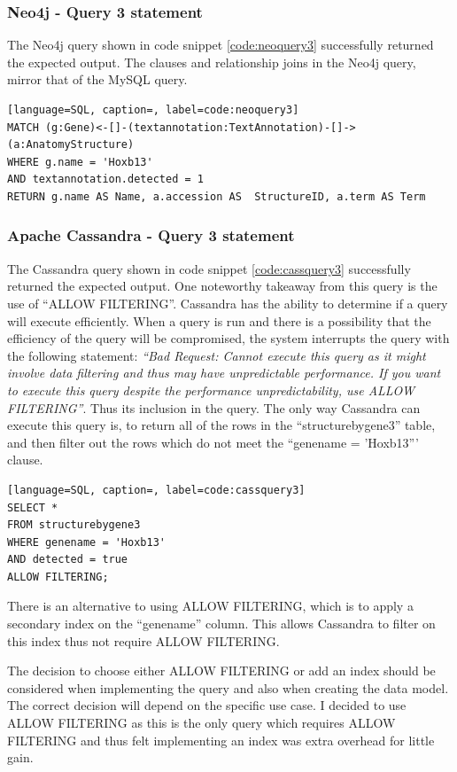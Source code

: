 \subsubsection*{Neo4j - Query 3 statement}\label{neoquery3statement}
The Neo4j query shown in code snippet \ref{code:neoquery3} successfully returned the expected output. The clauses and relationship joins in the Neo4j query, mirror that of the MySQL query.

\begin{lstlisting}[language=SQL, caption=, label=code:neoquery3]
MATCH (g:Gene)<-[]-(textannotation:TextAnnotation)-[]->(a:AnatomyStructure)
WHERE g.name = 'Hoxb13'
AND textannotation.detected = 1
RETURN g.name AS Name, a.accession AS  StructureID, a.term AS Term
\end{lstlisting}

\subsubsection*{Apache Cassandra - Query 3 statement}\label{cassquery3statement}
The Cassandra query shown in code snippet \ref{code:cassquery3} successfully returned the expected output. One noteworthy takeaway from this query is the use of ``ALLOW FILTERING''. Cassandra has the ability to determine if a query will execute efficiently. When a query is run and there is a possibility that the efficiency of the query will be compromised, the system interrupts the query with the following statement: \textit{``Bad Request: Cannot execute this query as it might involve data filtering and thus may have unpredictable performance. If you want to execute this query despite the performance unpredictability, use ALLOW FILTERING''}. Thus its inclusion in the query. The only way Cassandra can execute this query is, to return all of the rows in the ``structurebygene3'' table, and then filter out the rows which do not meet the ``genename = 'Hoxb13''' clause. 

\begin{lstlisting}[language=SQL, caption=, label=code:cassquery3]
SELECT *
FROM structurebygene3
WHERE genename = 'Hoxb13'
AND detected = true
ALLOW FILTERING;
\end{lstlisting}

There is an alternative to using ALLOW FILTERING, which is to apply a secondary index on the ``genename'' column. This allows Cassandra to filter on this index thus not require ALLOW FILTERING.

The decision to choose either ALLOW FILTERING or add an index should be considered when implementing the query and also when creating the data model. The correct decision will depend on the specific use case. I decided to use ALLOW FILTERING as this is the only query which requires ALLOW FILTERING and thus felt implementing an index was extra overhead for little gain.

